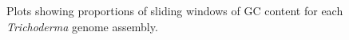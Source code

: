 \begin{figure}
  \begin{center}
  \end{center}
  \caption[GC content distribution for each Trichoderma genome assembly]{Plots showing proportions of sliding windows of GC content
    for each \textit{Trichoderma} genome assembly.}\label{fig:assembly-gc}
\end{figure}


